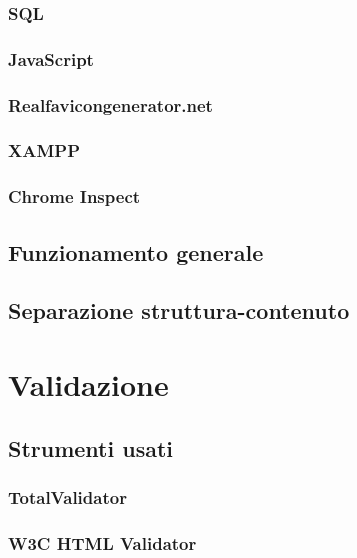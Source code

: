 \documentclass[a4paper, oneside, openany, dvipsnames, table]{article}
\begin{document}
		\subsubsection{SQL}
			
		\subsubsection{JavaScript}
			
		\subsubsection{Realfavicongenerator.net}
			
		\subsubsection{XAMPP}
			
		\subsubsection{Chrome Inspect}
			
	\subsection{Funzionamento generale}
		
	\subsection{Separazione struttura-contenuto}
		
	
\newpage
\section{Validazione}
	
	\subsection{Strumenti usati}
		
		\subsubsection{TotalValidator }
			
		\subsubsection{W3C HTML Validator}
			
\end{document}
